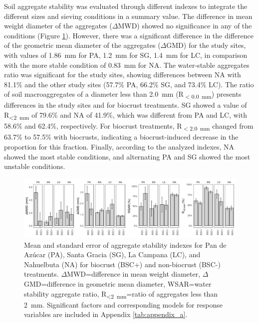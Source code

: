 \FloatBarrier

Soil aggregate stability was evaluated through different indexes to integrate the different sizes and sieving conditions in a summary value. The difference in mean weight diameter of the aggregates ($\Delta$MWD) showed no significance in any of the conditions (Figure \ref{fig:M1-F5}). However, there was a significant difference in the difference of the geometric mean diameter of the aggregates ($\Delta$GMD) for the study sites, with values of \SI{1.86}{\milli\meter} for PA, \SI{1.2}{\milli\meter} for SG, \SI{1.4}{\milli\meter} for LC, in comparison with the more stable condition of \SI{0.83}{\milli\meter} for NA. The water-stable aggregates ratio was significant for the study sites, showing differences between NA with 81.1\% and the other study sites (57.7\% PA, 66.2\% SG, and 73.4\% LC). The ratio of soil macroaggregates of a diameter less than \SI{2.0}{\milli\meter} (R\textsubscript{$<$\SI{0.0}{\milli\meter}}) presents differences in the study sites and for biocrust treatments. SG showed a value of R\textsubscript{<\SI{2}{\milli\meter}} of 79.6\% and NA of 41.9\%, which was different from PA and LC, with 58.6\% and 62.4\%, respectively. For biocrust treatments, R\textsubscript{$<$\SI{2.0}{\milli\meter}} changed from 63.7\% to 57.5\% with biocrusts, indicating a biocrust-induced decrease in the proportion for this fraction. Finally, according to the analyzed indexes, NA showed the most stable conditions, and alternating PA and SG showed the most unstable conditions.

\begin{figure}[H]
	\centering
	\includegraphics[width=1\textwidth]{img/M1-Figure_5.png}
	\caption[Values of aggregate stability indexes for the study sites and for biocrust and non-biocrust treatments]{Mean and standard error of aggregate stability indexes for Pan de Azúcar (PA), Santa Gracia (SG), La Campana (LC),
    and Nahuelbuta (NA) for biocrust (BSC+) and non-biocrust (BSC-) treatments. $\Delta$MWD=difference in mean weight diameter,
    $\Delta$GMD=difference in geometric mean diameter, WSAR=water stability aggregate ratio, R\textsubscript{<\SI{2}{\milli\meter}}=ratio of aggregates less than \SI{2}{\milli\meter}. Significant factors and corresponding models for response variables are included in Appendix \ref{tab:appendix_a}.}
	\label{fig:M1-F5}
\end{figure}

